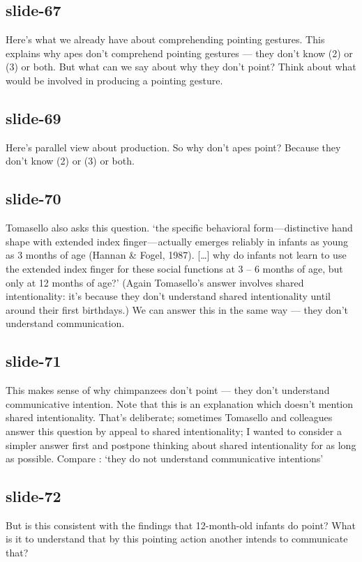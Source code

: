 \documentclass[12pt,\papersize]{extarticle}
\begin{document}
 
\subsection{slide-67}
Here's what we already have about comprehending pointing gestures.
This explains why apes don't comprehend pointing gestures --- they don't know (2) or (3) or both.
But what can we say about why they don't point? Think about what would be involved in producing a pointing gesture.
 
 
\subsection{slide-69}
Here's parallel view about production.
So why don't apes point?
Because they don't know (2) or (3) or both.
 
 
\subsection{slide-70}
Tomasello also asks this question.
‘the specific behavioral form — distinctive hand shape with extended index finger — actually emerges reliably in infants as young as 3 months of age (Hannan \& Fogel, 1987). […] why do infants not learn to use the extended index finger for these social functions at 3 – 6 months of age, but only at 12 months of age?’ \citep[p.\ 716]{Tomasello:2007fi}
(Again Tomasello's answer involves shared intentionality: it's because they don't understand shared intentionality until around their first birthdays.)
We can answer this in the same way --- they don't understand communication.
 
 
\subsection{slide-71}
This makes sense of why chimpanzees don't point --- they don't understand communicative intention.
Note that this is an explanation which doesn't mention shared intentionality.
That's deliberate; sometimes Tomasello and colleagues answer this question by appeal to shared intentionality; I wanted to consider a simpler answer first and postpone thinking about shared intentionality for as long as possible.
Compare \citep[p.\ 516]{Tomasello:2010dy}: ‘they do not understand communicative intentions’
 
 
\subsection{slide-72}
But is this consistent with the findings that 12-month-old infants do point?
What is it to understand that by this pointing action another intends to communicate that?
 
\end{document}
